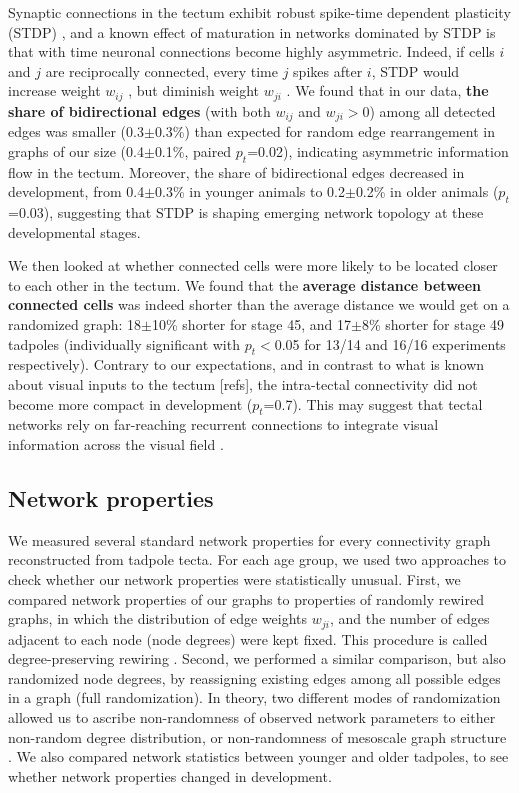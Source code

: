 \documentclass{article}
\begin{document}
Synaptic connections in the tectum exhibit robust spike-time dependent plasticity (STDP) \citep{mu2006stdp,pratt2008recurrent}, and a known effect of maturation in networks dominated by STDP is that with time neuronal connections become highly asymmetric. Indeed, if cells $i$ and $j$ are reciprocally connected, every time $j$ spikes after $i$, STDP would increase weight $w_{ij}$ , but diminish weight $w_{ji}$ \citep{abbott1996ltpsequence,fiete2010chains}. We found that in our data, \textbf{the share of bidirectional edges} (with both $w_{ij}$ and $w_{ji}>$0) among all detected edges was smaller (0.3$\pm$0.3\%) than expected for random edge rearrangement in graphs of our size (0.4$\pm$0.1\%, paired $p_t$=0.02), indicating asymmetric information flow in the tectum. Moreover, the share of bidirectional edges decreased in development, from 0.4$\pm$0.3\% in younger animals to 0.2$\pm$0.2\% in older animals ($p_t$=0.03), suggesting that STDP is shaping emerging network topology at these developmental stages.

We then looked at whether connected cells were more likely to be located closer to each other in the tectum. We found that the \textbf{average distance between connected cells} was indeed shorter than the average distance we would get on a randomized graph: 18$\pm$10\% shorter for stage 45, and 17$\pm$8\% shorter for stage 49 tadpoles (individually significant with $p_t<$0.05 for 13/14 and 16/16 experiments respectively). Contrary to our expectations, and in contrast to what is known about visual inputs to the tectum \citep{tao2005refinement}[refs], the intra-tectal connectivity did not become more compact in development ($p_t$=0.7). This may suggest that tectal networks rely on far-reaching recurrent connections to integrate visual information across the visual field \citep{baginskas2009recurrent,liu2016jumbo,jang2016}.

\subsection*{Network properties}

We measured several standard network properties for every connectivity graph reconstructed from tadpole tecta. For each age group, we used two approaches to check whether our network properties were statistically unusual. First, we compared network properties of our graphs to properties of randomly rewired graphs, in which the distribution of edge weights $w_{ji}$, and the number of edges adjacent to each node (node degrees) were kept fixed. This procedure is called degree-preserving rewiring \citep{maslov2002}. Second, we performed a similar comparison, but also randomized node degrees, by reassigning existing edges among all possible edges in a graph (full randomization). In theory, two different modes of randomization allowed us to ascribe non-randomness of observed network parameters to either non-random degree distribution, or non-randomness of mesoscale graph structure \citep{ansmann2012surrogate}. We also compared network statistics between younger and older tadpoles, to see whether network properties changed in development.
\end{document}
